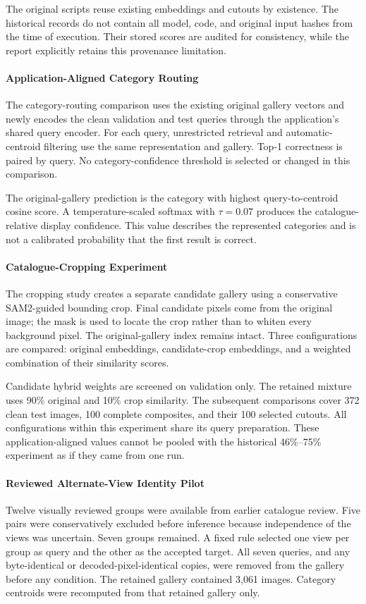 The original scripts reuse existing embeddings and cutouts by existence.
The historical records do not contain all model, code, and original input hashes
from the time of execution. Their stored scores are audited for consistency,
while the report explicitly retains this provenance limitation.

\paragraph{Application-Aligned Category Routing}
The category-routing comparison uses the existing original gallery vectors and
newly encodes the clean validation and test queries through
the application's shared query encoder. For each query, unrestricted retrieval and
automatic-centroid filtering use the same representation and gallery. Top-1
correctness is paired by query. No category-confidence threshold is selected or
changed in this comparison.

The original-gallery prediction is the category with highest query-to-centroid
cosine score. A temperature-scaled softmax with $\tau=0.07$ produces the
catalogue-relative display confidence. This value describes the represented
categories and is not a calibrated probability that the first result is correct.

\paragraph{Catalogue-Cropping Experiment}
The cropping study creates a separate candidate gallery using a conservative
SAM2-guided bounding crop. Final candidate pixels come from the original image;
the mask is used to locate the crop rather than to whiten every background
pixel. The original-gallery index remains intact. Three configurations are
compared: original embeddings, candidate-crop embeddings, and a weighted
combination of their similarity scores.

Candidate hybrid weights are screened on validation only. The retained mixture
uses 90\% original and 10\% crop similarity. The subsequent comparisons cover
372 clean test images, 100 complete composites, and their 100 selected cutouts.
All configurations within this experiment share its query preparation. These
application-aligned values cannot be pooled with the historical 46\%--75\%
experiment as if they came from one run.

\paragraph{Reviewed Alternate-View Identity Pilot}
Twelve visually reviewed groups were available from earlier catalogue review.
Five pairs were conservatively excluded before inference because independence
of the views was uncertain. Seven groups remained. A fixed rule selected one
view per group as query and the other as the accepted target. All seven queries,
and any byte-identical or decoded-pixel-identical copies, were removed from the
gallery before any condition. The retained gallery contained 3,061 images.
Category centroids were recomputed from that retained gallery only.

